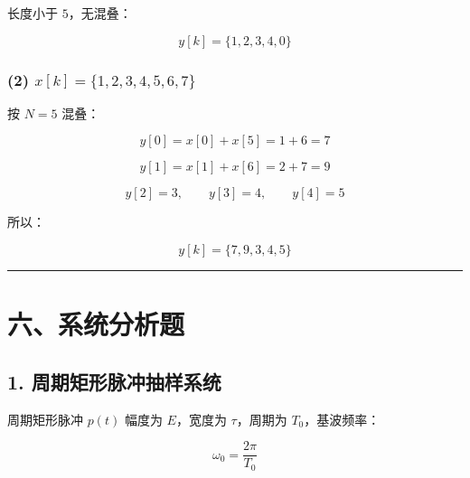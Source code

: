 \documentclass[11pt]{ctexart}
\begin{document}
长度小于 \(5\)，无混叠：\par



\[

y[k]=\{1,2,3,4,0\}

\]



\subsubsection*{(2) \(x[k]=\{1,2,3,4,5,6,7\}\)}



按 \(N=5\) 混叠：\par



\[

y[0]=x[0]+x[5]=1+6=7

\]



\[

y[1]=x[1]+x[6]=2+7=9

\]



\[

y[2]=3,\qquad y[3]=4,\qquad y[4]=5

\]



所以：\par



\[

y[k]=\{7,9,3,4,5\}

\]



\medskip\hrule\medskip



\section*{六、系统分析题}



\subsection*{1. 周期矩形脉冲抽样系统}



周期矩形脉冲 \(p(t)\) 幅度为 \(E\)，宽度为 \(\tau\)，周期为 \(T_0\)，基波频率：\par



\[

\omega_0=\frac{2\pi}{T_0}

\]
\end{document}
